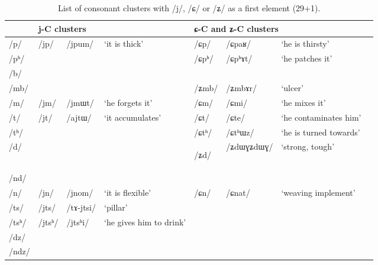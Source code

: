 \documentclass[12pt]{article}
\newcommand{\ipa}[1]{\mbox{\phon/#1/}}
\newcommand{\ipab}[1]{{\phon#1}}
\newcommand{\deux}[1]{\ipa{#1}\addtocounter{2clusters}{1}}
\newcommand{\idph}[1]{\cellcolor{gray}\textbf{#1}}
\begin{document}
\begin{landscape}  
\begin{longtable}{llllllll}
 \caption{List of consonant clusters with \ipa{j}, \ipa{ɕ} or \ipa{ʑ}  as a first element (29+1).} \label{prein.j.Z}  \\
\toprule
 & \multicolumn{3}{l}{\ipab{j}-C clusters} & \multicolumn{3}{l}{\ipab{ɕ}-C and \ipab{ʑ}-C clusters} &   \\
\midrule
\ipa{p} & \deux{jp} & \ipa{jpum} & `it is thick' & \deux{ɕp} & \ipa{ɕpaʁ} & `he is thirsty' & \\
\ipa{pʰ} & & & & \deux{ɕpʰ} & \ipa{ɕpʰɤt} & `he patches it' & \\
\ipa{b} & & & & & & & \\
\ipa{mb} & & & & \deux{ʑmb} & \ipa{ʑmbɤr} & `ulcer' & \\
\ipa{m} & \deux{jm} & \ipa{jmɯt} & `he forgets it' & \deux{ɕm} & \ipa{ɕmi} & `he mixes it' & \\
\ipa{t} & \deux{jt} & \ipa{ajtɯ} & `it accumulates' & \deux{ɕt} & \ipa{ɕte} & `he contaminates him' & \\
\ipa{tʰ} & & & & \deux{ɕtʰ} & \ipa{ɕtʰɯz} & `he is turned towards' & \\
\ipa{d} & & & & \deux{ʑd} \idph{} & \ipa{ʑdɯɣʑdɯɣ} & `strong, tough' & \\
\ipa{nd} & & & & & & & \\
\ipa{n} & \deux{jn} & \ipa{jnom} & `it is flexible' & \deux{ɕn} & \ipa{ɕnat} & `weaving implement' & \\
\ipa{ts} & \deux{jts} & \ipa{tɤ-jtsi} & `pillar' & & & & \\
\ipa{tsʰ} & \deux{jtsʰ} & \ipa{jtsʰi} & `he gives him to drink' & & & & \\
\ipa{dz} & & & & & & & \\
\ipa{ndz} & & & & & & & \\

\end{longtable}
\end{landscape}
\end{document}
